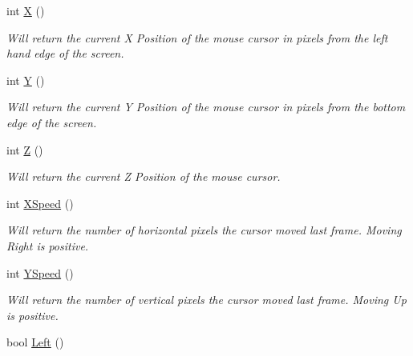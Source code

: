 \begin{DoxyCompactItemize}
\item 
\hypertarget{classc_mouse_a4c39f6fc4be0cce7d3347a5d176e14c5}{
int \hyperlink{classc_mouse_a4c39f6fc4be0cce7d3347a5d176e14c5}{X} ()}
\label{classc_mouse_a4c39f6fc4be0cce7d3347a5d176e14c5}

\begin{DoxyCompactList}\small\item\em Will return the current X Position of the mouse cursor in pixels from the left hand edge of the screen. \end{DoxyCompactList}\item 
\hypertarget{classc_mouse_a58175245ddfa05f779ff6b01be8559b4}{
int \hyperlink{classc_mouse_a58175245ddfa05f779ff6b01be8559b4}{Y} ()}
\label{classc_mouse_a58175245ddfa05f779ff6b01be8559b4}

\begin{DoxyCompactList}\small\item\em Will return the current Y Position of the mouse cursor in pixels from the bottom edge of the screen. \end{DoxyCompactList}\item 
\hypertarget{classc_mouse_ac4723c282e2e7226230a87e06785d10b}{
int \hyperlink{classc_mouse_ac4723c282e2e7226230a87e06785d10b}{Z} ()}
\label{classc_mouse_ac4723c282e2e7226230a87e06785d10b}

\begin{DoxyCompactList}\small\item\em Will return the current Z Position of the mouse cursor. \end{DoxyCompactList}\item 
\hypertarget{classc_mouse_a2d60319fb5361eab17e50434397458c6}{
int \hyperlink{classc_mouse_a2d60319fb5361eab17e50434397458c6}{XSpeed} ()}
\label{classc_mouse_a2d60319fb5361eab17e50434397458c6}

\begin{DoxyCompactList}\small\item\em Will return the number of horizontal pixels the cursor moved last frame. Moving Right is positive. \end{DoxyCompactList}\item 
\hypertarget{classc_mouse_a32d613880fee10cf47e4245b8627b6de}{
int \hyperlink{classc_mouse_a32d613880fee10cf47e4245b8627b6de}{YSpeed} ()}
\label{classc_mouse_a32d613880fee10cf47e4245b8627b6de}

\begin{DoxyCompactList}\small\item\em Will return the number of vertical pixels the cursor moved last frame. Moving Up is positive. \end{DoxyCompactList}\item 
\hypertarget{classc_mouse_a0f6cd75cafc7c7ff7f00947e2f98b092}{
bool \hyperlink{classc_mouse_a0f6cd75cafc7c7ff7f00947e2f98b092}{Left} ()}
\label{classc_mouse_a0f6cd75cafc7c7ff7f00947e2f98b092}


\end{DoxyCompactItemize}
